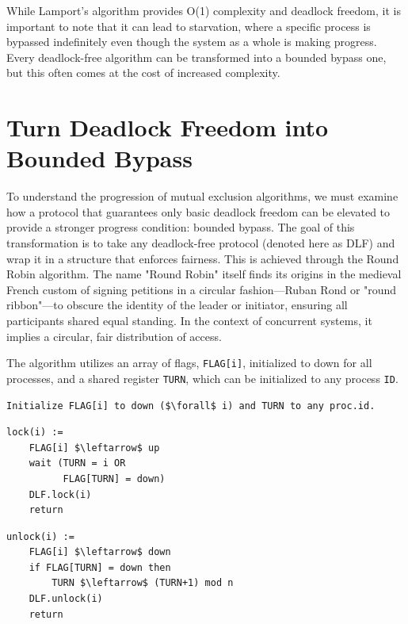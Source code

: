 While Lamport's algorithm provides O(1) complexity and deadlock freedom, it is important to note that it can lead to starvation, where a specific process is bypassed indefinitely even though the system as a whole is making progress. Every deadlock-free algorithm can be transformed into a bounded bypass one, but this often comes at the cost of increased complexity.

\section{Turn Deadlock Freedom into Bounded Bypass}
To understand the progression of mutual exclusion algorithms, we must examine how a protocol that guarantees only basic deadlock freedom can be elevated to provide a stronger progress condition: bounded bypass.
The goal of this transformation is to take any deadlock-free protocol (denoted here as DLF) and wrap it in a structure that enforces fairness. This is achieved through the Round Robin algorithm. The name "Round Robin" itself finds its origins in the medieval French custom of signing petitions in a circular fashion—Ruban Rond or "round ribbon"—to obscure the identity of the leader or initiator, ensuring all participants shared equal standing. In the context of concurrent systems, it implies a circular, fair distribution of access.

The algorithm utilizes an array of flags, \texttt{FLAG[i]}, initialized to down for all processes, and a shared register \texttt{TURN}, which can be initialized to any process \texttt{ID}. 

\begin{minipage}{\textwidth}
\begin{lstlisting}[mathescape]
Initialize FLAG[i] to down ($\forall$ i) and TURN to any proc.id.
\end{lstlisting}
\begin{minipage}{0.45\textwidth}
\begin{lstlisting}[mathescape]
lock(i) :=
    FLAG[i] $\leftarrow$ up
    wait (TURN = i OR
          FLAG[TURN] = down)
    DLF.lock(i)
    return
\end{lstlisting}
\end{minipage}
\hfill
\begin{minipage}{0.45\textwidth}
\begin{lstlisting}[mathescape]
unlock(i) :=
    FLAG[i] $\leftarrow$ down
    if FLAG[TURN] = down then
        TURN $\leftarrow$ (TURN+1) mod n
    DLF.unlock(i)
    return
\end{lstlisting}
\end{minipage}
\end{minipage}\\

